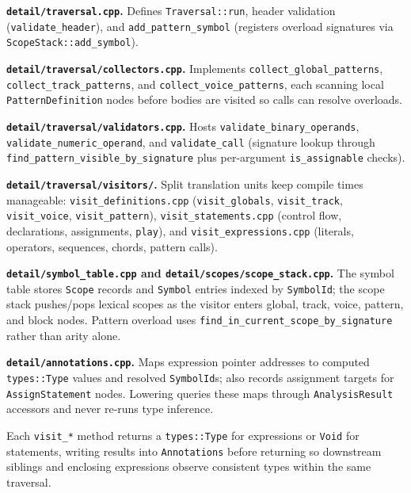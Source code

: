 \noindent \textbf{\texttt{detail/traversal.cpp}.} Defines \texttt{Traversal::run}, header validation
(\texttt{validate\_header}), and \texttt{add\_pattern\_symbol} (registers overload signatures via
\texttt{ScopeStack::add\_symbol}).

\noindent \textbf{\texttt{detail/traversal/collectors.cpp}.} Implements \texttt{collect\_global\_patterns},
\texttt{collect\_track\_patterns}, and \texttt{collect\_voice\_patterns}, each scanning local \texttt{PatternDefinition}
nodes before bodies are visited so calls can resolve overloads.

\noindent \textbf{\texttt{detail/traversal/validators.cpp}.} Hosts \texttt{validate\_binary\_operands},
\texttt{validate\_numeric\_operand}, and \texttt{validate\_call} (signature lookup through
\texttt{find\_pattern\_visible\_by\_signature} plus per-argument \texttt{is\_assignable} checks).

\noindent \textbf{\texttt{detail/traversal/visitors/}.} Split translation units keep compile times manageable:
\texttt{visit\_definitions.cpp} (\texttt{visit\_globals}, \texttt{visit\_track}, \texttt{visit\_voice},
\texttt{visit\_pattern}), \texttt{visit\_statements.cpp} (control flow, declarations, assignments, \texttt{play}),
and \texttt{visit\_expressions.cpp} (literals, operators, sequences, chords, pattern calls).

\noindent \textbf{\texttt{detail/symbol\_table.cpp} and \texttt{detail/scopes/scope\_stack.cpp}.} The symbol table
stores \texttt{Scope} records and \texttt{Symbol} entries indexed by \texttt{SymbolId}; the scope stack pushes/pops
lexical scopes as the visitor enters global, track, voice, pattern, and block nodes.
Pattern overload uses \texttt{find\_in\_current\_scope\_by\_signature} rather than arity alone.

\noindent \textbf{\texttt{detail/annotations.cpp}.} Maps expression pointer addresses to computed \texttt{types::Type}
values and resolved \texttt{SymbolId}s; also records assignment targets for \texttt{AssignStatement} nodes.
Lowering queries these maps through \texttt{AnalysisResult} accessors and never re-runs type inference.

Each \texttt{visit\_*} method returns a \texttt{types::Type} for expressions or \texttt{Void} for statements, writing
results into \texttt{Annotations} before returning so downstream siblings and enclosing expressions observe consistent
types within the same traversal.
